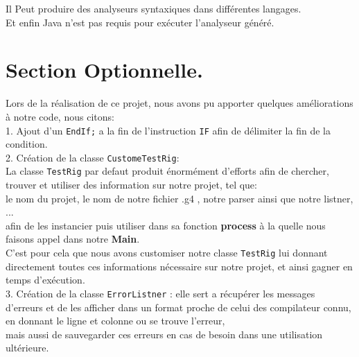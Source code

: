 \documentclass[12pt]{article}
\begin{document}
Il Peut produire des analyseurs syntaxiques dans différentes langages.\\

Et enfin Java n'est pas requis pour exécuter l'analyseur généré.\\



\section{Section Optionnelle.}
Lors de la réalisation de ce projet, nous avons pu apporter quelques améliorations à notre code, nous citons: \\

1. Ajout d'un \texttt{EndIf;} a la fin de l'instruction \texttt{IF} afin de délimiter la fin de la condition.\\

2. Création de la classe \texttt{CustomeTestRig}:\\
La classe \texttt{TestRig} par defaut produit énormément d'efforts afin de chercher, trouver et utiliser des information sur notre projet, tel que:\\
 le nom du projet, le nom de notre fichier .g4 , notre parser ainsi que notre listner, ... \\
 
afin de les instancier puis utiliser dans sa fonction \textbf{process} à la quelle nous faisons appel dans notre \textbf{Main}.\\ 

C'est pour cela que nous avons customiser notre classe \texttt{TestRig} lui donnant directement toutes ces informations nécessaire sur notre projet, et ainsi gagner en temps d'exécution.\\

3. Création de la classe \texttt{ErrorListner} : elle sert a récupérer les messages d'erreurs et de les afficher dans un format proche de celui des compilateur connu, en donnant le ligne et colonne ou se trouve l'erreur,\\
 mais aussi de sauvegarder ces erreurs en cas de besoin dans une utilisation ultérieure.\\
\end{document}
